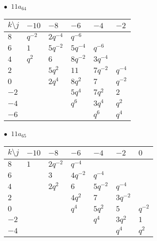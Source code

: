 \begin{minipage}{\linewidth}
$\bullet\ $ $11a_{64}$ \vspace{0.5em} \\
\begin{tabular}{l|lllll}
$k \setminus j$ & $-10$ & $-8$ & $-6$ & $-4$ & $-2$ \\
\hline
$8$ & $q^{-2}$ & $2q^{-4}$ & $q^{-6}$ &  &  \\
$6$ & $1$ & $5q^{-2}$ & $5q^{-4}$ & $q^{-6}$ &  \\
$4$ & $q^{2}$ & $6$ & $8q^{-2}$ & $3q^{-4}$ &  \\
$2$ &  & $5q^{2}$ & $11$ & $7q^{-2}$ & $q^{-4}$ \\
$0$ &  & $2q^{4}$ & $8q^{2}$ & $7$ & $q^{-2}$ \\
$-2$ &  &  & $5q^{4}$ & $7q^{2}$ & $2$ \\
$-4$ &  &  & $q^{6}$ & $3q^{4}$ & $q^{2}$ \\
$-6$ &  &  &  & $q^{6}$ & $q^{4}$ \\
\end{tabular}
\vspace{2em}
\end{minipage}
%
\begin{minipage}{\linewidth}
$\bullet\ $ $11a_{65}$ \vspace{0.5em} \\
\begin{tabular}{l|llllll}
$k \setminus j$ & $-10$ & $-8$ & $-6$ & $-4$ & $-2$ & $0$ \\
\hline
$8$ & $1$ & $2q^{-2}$ & $q^{-4}$ &  &  &  \\
$6$ &  & $3$ & $4q^{-2}$ & $q^{-4}$ &  &  \\
$4$ &  & $2q^{2}$ & $6$ & $5q^{-2}$ & $q^{-4}$ &  \\
$2$ &  &  & $4q^{2}$ & $7$ & $3q^{-2}$ &  \\
$0$ &  &  & $q^{4}$ & $5q^{2}$ & $5$ & $q^{-2}$ \\
$-2$ &  &  &  & $q^{4}$ & $3q^{2}$ & $1$ \\
$-4$ &  &  &  &  & $q^{4}$ & $q^{2}$ \\
\end{tabular}
\vspace{2em}
\end{minipage}
%
